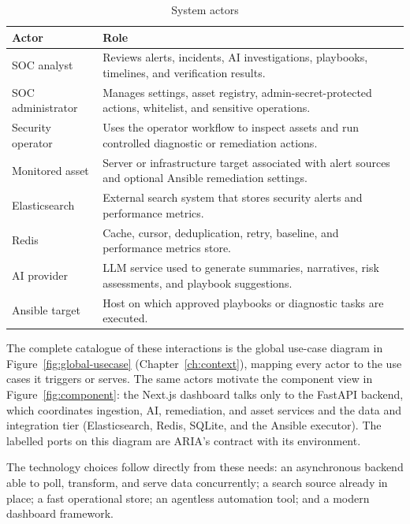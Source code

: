 \begin{table}[H]
\centering
\caption{System actors}
\begin{tabularx}{\textwidth}{@{}p{}Y@{}}
\toprule
\textbf{Actor} & \textbf{Role} \\
\midrule
SOC analyst & Reviews alerts, incidents, AI investigations, playbooks, timelines, and verification results. \\
SOC administrator & Manages settings, asset registry, admin-secret-protected actions, whitelist, and sensitive operations. \\
Security operator & Uses the operator workflow to inspect assets and run controlled diagnostic or remediation actions. \\
Monitored asset & Server or infrastructure target associated with alert sources and optional Ansible remediation settings. \\
Elasticsearch & External search system that stores security alerts and performance metrics. \\
Redis & Cache, cursor, deduplication, retry, baseline, and performance metrics store. \\
AI provider & LLM service used to generate summaries, narratives, risk assessments, and playbook suggestions. \\
Ansible target & Host on which approved playbooks or diagnostic tasks are executed. \\
\bottomrule
\end{tabularx}
\end{table}

The complete catalogue of these interactions is the global use-case diagram in Figure~\ref{fig:global-usecase} (Chapter~\ref{ch:context}), mapping every actor to the use cases it triggers or serves. The same actors motivate the component view in Figure~\ref{fig:component}: the Next.js dashboard talks only to the FastAPI backend, which coordinates ingestion, AI, remediation, and asset services and the data and integration tier (Elasticsearch, Redis, SQLite, and the Ansible executor). The labelled ports on this diagram are ARIA's contract with its environment.


The technology choices follow directly from these needs: an asynchronous backend able to poll, transform, and serve data concurrently; a search source already in place; a fast operational store; an agentless automation tool; and a modern dashboard framework.

